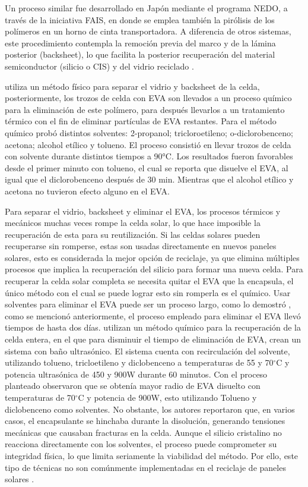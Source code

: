 Un proceso similar fue desarrollado en Japón mediante el programa NEDO, a través de la iniciativa FAIS, en donde se emplea también la pirólisis de los polímeros en un horno de cinta transportadora. A diferencia de otros sistemas, este procedimiento contempla la remoción previa del marco y de la lámina posterior (backsheet), lo que facilita la posterior recuperación del material semiconductor (silicio o CIS) y del vidrio reciclado \citep{Komoto2014}.

\citet{Sukmin2007} utiliza un método físico para separar el vidrio y backsheet de la celda, posteriormente, los trozos de celda con EVA son llevados a un proceso químico para la eliminación de este polímero, para después llevarlos a un tratamiento térmico con el fin de eliminar partículas de EVA restantes. Para el método químico probó distintos solventes: 2-propanol; tricloroetileno; o-diclorobenceno; acetona; alcohol etílico y tolueno. El proceso consistió en llevar trozos de celda con solvente durante distintos tiempos a 90°C. Los resultados fueron favorables desde el primer minuto con tolueno, el cual se reporta que disuelve el EVA, al igual que el diclorobenceno después de 30 min. Mientras que el alcohol etílico y acetona no tuvieron efecto alguno en el EVA. 

Para separar el vidrio, backsheet y eliminar el EVA, los procesos térmicos y mecánicos muchas veces rompe la celda solar, lo que hace imposible la recuperación de esta para su reutilización. Si las celdas solares pueden recuperarse sin romperse, estas son usadas directamente en nuevos paneles solares, esto es considerada la mejor opción de reciclaje, ya que elimina múltiples procesos que implica la recuperación del silicio para formar una nueva celda. Para recuperar la celda solar completa se necesita quitar el EVA que la encapsula, el único método con el cual se puede lograr esto sin romperla es el químico. Usar solventes para eliminar el EVA puede ser un proceso largo, como lo demostró \citet{Sukmin2007}, como se mencionó anteriormente, el proceso empleado para eliminar el EVA llevó tiempos de hasta dos días. \citet{Kim2012} utilizan un método químico para la recuperación de la celda entera, en el que para disminuir el tiempo de eliminación de EVA, crean un sistema con baño ultrasónico. El sistema cuenta con recirculación del solvente, utilizando tolueno, tricloetileno y diclobenceno a temperaturas de 55 y 70$^{\circ}$C y potencia ultrasónica de 450 y 900W durante 60 minutos. Con el proceso planteado observaron que se obtenía mayor radio de EVA disuelto con temperaturas de 70$^{\circ}$C y potencia de 900W, esto utilizando Tolueno y diclobenceno como solventes. No obstante, los autores reportaron que, en varios casos, el encapsulante se hinchaba durante la disolución, generando tensiones mecánicas que causaban fracturas en la celda. Aunque el silicio cristalino no reacciona directamente con los solventes, el proceso puede comprometer su integridad física, lo que limita seriamente la viabilidad del método. Por ello, este tipo de técnicas no son comúnmente implementadas en el reciclaje de paneles solares \citep{Kim2012}.

